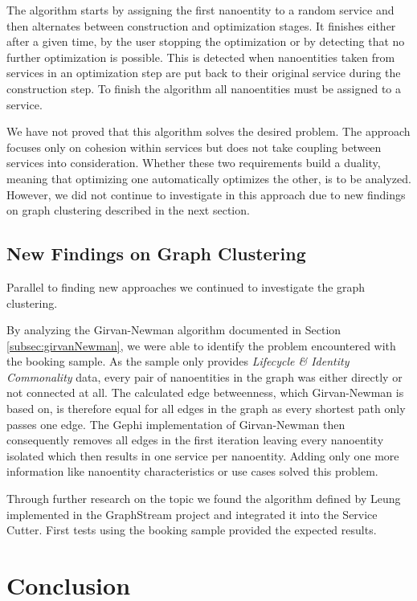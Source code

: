 The algorithm starts by assigning the first nanoentity to a random service and then alternates between construction and optimization stages. It finishes either after a given time, by the user stopping the optimization or by detecting that no further optimization is possible. This is detected when nanoentities taken from services in an optimization step are put back to their original service during the construction step. To finish the algorithm all nanoentities must be assigned to a service.

We have not proved that this algorithm solves the desired problem. The approach focuses only on cohesion within services but does not take coupling between services into consideration. Whether these two requirements build a duality, meaning that optimizing one automatically optimizes the other, is to be analyzed. However, we did not continue to investigate in this approach due to new findings on graph clustering described in the next section.

\subsection{New Findings on Graph Clustering}

Parallel to finding new approaches we continued to investigate the graph clustering.

By analyzing the Girvan-Newman algorithm documented in Section \ref{subsec:girvanNewman}, we were able to identify the problem encountered with the booking sample. As the sample only provides \textit{Lifecycle \& Identity Commonality} data, every pair of nanoentities in the graph was either directly or not connected at all. The calculated edge betweenness, which Girvan-Newman is based on, is therefore equal for all edges in the graph as every shortest path only passes one edge. The Gephi\cite{gephi} implementation of Girvan-Newman then consequently removes all edges in the first iteration leaving every nanoentity isolated which then results in one service per nanoentity. Adding only one more information like nanoentity characteristics or use cases solved this problem.

Through further research on the topic we found the algorithm defined by Leung implemented in the GraphStream\cite{leungGraphstream} project and integrated it into the Service Cutter. First tests using the booking sample provided the expected results.
\clearpage
\section{Conclusion}

